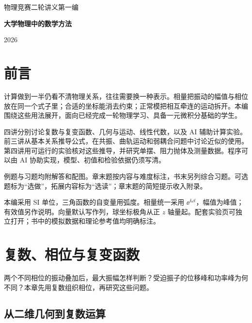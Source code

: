 \documentclass[11pt,openany,fontset=fandol]{ctexbook}
\theoremstyle{plain}\newtheorem{theorem}{定理}[chapter]\newtheorem{proposition}[theorem]{命题}
\theoremstyle{definition}\newtheorem{definition}{定义}[chapter]\newtheorem{example}{例}[chapter]
\theoremstyle{remark}\newtheorem*{remark}{说明}
\begin{document}
\frontmatter
\begin{titlepage}
\centering\vspace*{30mm}
{\Large 物理竞赛二轮讲义\quad 第一编\par}\vspace{8mm}

{\Huge\bfseries 大学物理中的数学方法\par}
\vspace{12mm}{\Large 物理竞赛二轮讲义\par}
\vspace{10mm}{\large 复数、几何、线性代数与AI计算实验\par}
\vfill{\large 2026\par}
\end{titlepage}

\chapter*{前言}
计算做到一半仍看不清物理关系，往往需要换一种表示。相量把振动的幅值与相位放在同一个式子里；合适的坐标能消去约束；正常模把相互牵连的运动拆开。本编围绕这些用法展开，面向已经完成一轮物理学习、具备一元微积分基础的学生。

四讲分别讨论复数与复变函数、几何与运动、线性代数，以及 AI 辅助计算实验。前三讲从基本关系推导公式，在共振、曲轨运动和弱耦合问题中讨论近似的使用。第四讲用可运行的实验核对这些推导，并研究单摆、阻力抛体及测量数据。程序可以由 AI 协助实现，模型、初值和检验依据仍须写清。

例题与习题均附解答和配图。章末题按内容与难度标注，书末另列综合习题。可选题标为“选做”，拓展内容标为“选读”；章末题的简短提示收入附录。

本编采用 SI 单位，三角函数的自变量用弧度。相量统一采用 $\ee^{\ii\omega t}$，幅值为峰值；有效值另作说明。向量默认写作列，球坐标极角从正 $z$ 轴量起。配套实验页可独立打开；书中的模拟数据和理论参考值均明确标注。

\tableofcontents
\let\cleardoublepage\clearpage
\mainmatter
\chapter{复数、相位与复变函数}
两个不同相位的振动叠加后，最大振幅怎样判断？受迫振子的位移峰和功率峰为何不同？本章先用复数组织相位，再研究这些问题。

\section{从二维几何到复数运算}
\end{document}
